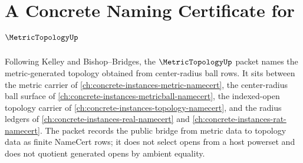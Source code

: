 \chapter{A Concrete Naming Certificate for $\MetricTopologyUp$}
\label{ch:concrete-instances-metric-topology-namecert}

Following Kelley and Bishop--Bridges, the $\MetricTopologyUp$ packet names the metric-generated topology obtained from center-radius ball rows. It sits between the metric carrier of \autoref{ch:concrete-instances-metric-namecert}, the center-radius ball surface of \autoref{ch:concrete-instances-metricball-namecert}, the indexed-open topology carrier of \autoref{ch:concrete-instances-topology-namecert}, and the radius ledgers of \autoref{ch:concrete-instances-real-namecert} and \autoref{ch:concrete-instances-rat-namecert}. The packet records the public bridge from metric data to topology data as finite NameCert rows; it does not select opens from a host powerset and does not quotient generated opens by ambient equality.

